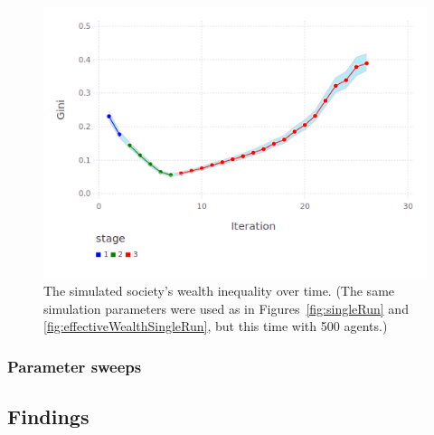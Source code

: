 \begin{figure}[hb]
\centering
\includegraphics[width=\columnwidth]{figures/giniHistory.png}
\caption{The simulated society's wealth inequality over time. (The same
simulation parameters were used as in Figures~\ref{fig:singleRun} and
\ref{fig:effectiveWealthSingleRun}, but this time with 500 agents.)}
\label{fig:giniHistory}
\end{figure}





\subsubsection{Parameter sweeps}


\subsection{Findings}


